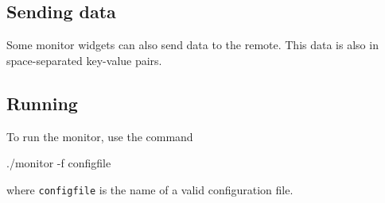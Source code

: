 \subsection{Sending data}
Some monitor widgets can also send data to the remote. This data
is also in space-separated key-value pairs.

\subsection{Running}
To run the monitor, use the command
\begin{v}
./monitor -f configfile
\end{v}
where \texttt{configfile} is the name of a valid configuration file.
